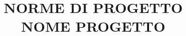 


\newcommand{\docNome}{ NORME DI PROGETTO }
\newcommand{\docVersione}{0.0.2}
\newcommand{\docNomeProgetto}{ NOME PROGETTO }
\newcommand{\docStatus}{in redazione}
\newcommand{\docUso}{interno}
\newcommand{\docDescrizione}{
    \begin{center}
    Breve descrizione del documento
    \end{center}
}


\newcommand{\docRedattori}{
	Gianmarco Guazzo\\&
    Ivan Furlan
}
\newcommand{\docVerificatori}{
	nome cognome \\&
    nome cognome
}
\newcommand{\docApprovazione}{
    nome cognome
}

\newcommand{\nomeCorso}{
    Ingegneria del Software - Università degli Studi di Padova
}



\documentclass[11pt,a4paper,table]{article}




\title{ \hr \huge \textsc{\docNome} \\
        \vspace{11pt} \large \textsc{\docNomeProgetto} \hr}

\author{} %
\date{} %








\newpage
{}


\tableofcontents


\newpage







